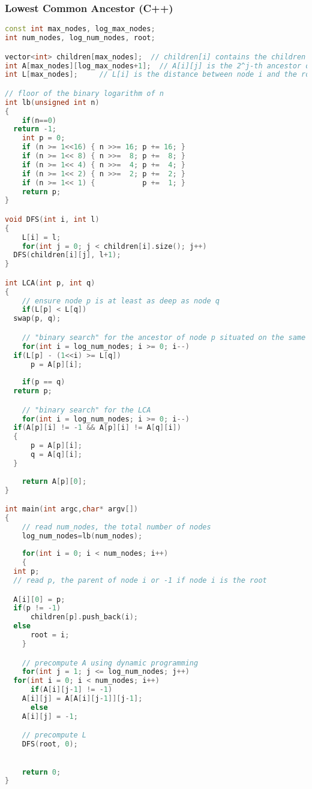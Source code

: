 \subsubsection{Lowest Common Ancestor (C++)}
\begin{lstlisting}[language=C++]
const int max_nodes, log_max_nodes;
int num_nodes, log_num_nodes, root;

vector<int> children[max_nodes];  // children[i] contains the children of node i
int A[max_nodes][log_max_nodes+1];  // A[i][j] is the 2^j-th ancestor of node i, or -1 if that ancestor does not exist
int L[max_nodes];     // L[i] is the distance between node i and the root

// floor of the binary logarithm of n
int lb(unsigned int n)
{
    if(n==0)
  return -1;
    int p = 0;
    if (n >= 1<<16) { n >>= 16; p += 16; }
    if (n >= 1<< 8) { n >>=  8; p +=  8; }
    if (n >= 1<< 4) { n >>=  4; p +=  4; }
    if (n >= 1<< 2) { n >>=  2; p +=  2; }
    if (n >= 1<< 1) {           p +=  1; }
    return p;
}

void DFS(int i, int l)
{
    L[i] = l;
    for(int j = 0; j < children[i].size(); j++)
  DFS(children[i][j], l+1);
}

int LCA(int p, int q)
{
    // ensure node p is at least as deep as node q
    if(L[p] < L[q])
  swap(p, q);

    // "binary search" for the ancestor of node p situated on the same level as q
    for(int i = log_num_nodes; i >= 0; i--)
  if(L[p] - (1<<i) >= L[q])
      p = A[p][i];
    
    if(p == q)
  return p;

    // "binary search" for the LCA
    for(int i = log_num_nodes; i >= 0; i--)
  if(A[p][i] != -1 && A[p][i] != A[q][i])
  {
      p = A[p][i];
      q = A[q][i];
  }
    
    return A[p][0];
}

int main(int argc,char* argv[])
{
    // read num_nodes, the total number of nodes
    log_num_nodes=lb(num_nodes);
    
    for(int i = 0; i < num_nodes; i++)
    {
  int p;
  // read p, the parent of node i or -1 if node i is the root

  A[i][0] = p;
  if(p != -1)
      children[p].push_back(i);
  else
      root = i;
    }

    // precompute A using dynamic programming
    for(int j = 1; j <= log_num_nodes; j++)
  for(int i = 0; i < num_nodes; i++)
      if(A[i][j-1] != -1)
    A[i][j] = A[A[i][j-1]][j-1];
      else
    A[i][j] = -1;

    // precompute L
    DFS(root, 0);

    
    return 0;
}

\end{lstlisting}
